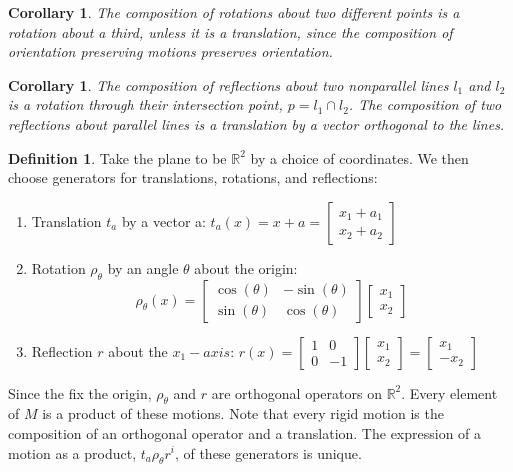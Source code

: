 \documentclass[12pt]{article}
\newtheorem{cor}[thm]{Corollary}
\theoremstyle{definition}
\newtheorem{defn}[thm]{Definition}
\theoremstyle{remark}
\numberwithin{equation}{section}
\newcommand\R{\mathbb R}    %
\begin{document}
\vspace{15pt}

\begin{cor}
        The composition of rotations about two different points is a rotation about a third, unless it is a translation, since the composition of orientation preserving motions preserves orientation. 
\end{cor}


\vspace{15pt}

\begin{cor}
        The composition of reflections about two nonparallel lines $l_1$ and $l_2$ is a rotation through their intersection point, $p =l_1 \cap l_2$. The composition of two reflections about parallel lines is a translation by a vector orthogonal to the lines.
\end{cor}


\vspace{15pt}


\begin{defn}
        Take the plane to be $\R^2$ by a choice of coordinates. We then choose generators for translations, rotations, and reflections: \begin{enumerate}
                \item Translation $t_a$ by a vector a: $t_a(x) = x+a = \begin{bmatrix} x_1 + a_1 \\ x_2 + a_2 \end{bmatrix}$
                        \item Rotation $\rho_{\theta}$ by an angle $\theta$ about the origin: $$\rho_{\theta}(x) = \begin{bmatrix} \cos(\theta) & -\sin(\theta) \\ \sin(\theta) & \cos(\theta)\end{bmatrix}\begin{bmatrix} x_1\\x_2\end{bmatrix}$$
                                \item Reflection $r$ about the $x_1-axis$: $r(x) = \begin{bmatrix} 1 & 0 \\ 0 & -1\end{bmatrix}\begin{bmatrix} x_1 \\ x_2 \end{bmatrix} = \begin{bmatrix} x_1 \\ -x_2 \end{bmatrix}$
        \end{enumerate}
        Since the fix the origin, $\rho_{\theta}$ and $r$ are orthogonal operators on $\R^2$. Every element of $M$ is a product of these motions. Note that every rigid motion is the composition of an orthogonal operator and a translation. The expression of a motion as a product, $t_{a}\rho_{\theta}r^i$, of these generators is unique.
\end{defn}
\end{document}
